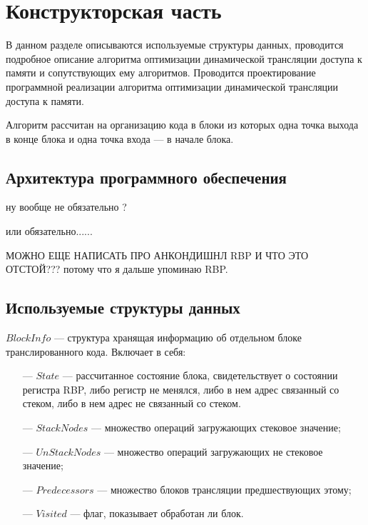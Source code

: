 \section{Конструкторская часть}

В данном разделе описываются используемые структуры данных, проводится
подробное описание алгоритма оптимизации динамической трансляции доступа к памяти и сопутствующих ему алгоритмов. Проводится проектирование программной реализации алгоритма оптимизации динамической трансляции доступа к памяти.

Алгоритм рассчитан на организацию кода в блоки из которых одна точка выхода в конце блока и одна точка входа --- в начале блока.

\subsection{Архитектура программного обеспечения}

ну вообще не обязательно ?

или обязательно...... 

МОЖНО ЕЩЕ НАПИСАТЬ ПРО АНКОНДИШНЛ RBP И ЧТО ЭТО ОТСТОЙ??? потому что я дальше упоминаю RBP.

\subsection{Используемые структуры данных}

$BlockInfo$ --- структура хранящая информацию об отдельном блоке транслированного кода. Включает в себя:

\begin{itemize}[leftmargin=1.6\parindent]
	\item[---] $State$ --- рассчитанное состояние блока, свидетельствует о состоянии регистра RBP, либо регистр не менялся, либо в нем адрес связанный со стеком, либо в нем адрес не связанный со стеком.
	\item[---] $StackNodes$ --- множество операций загружающих стековое значение;
	\item[---] $UnStackNodes$ --- множество операций загружающих не стековое значение;
	\item[---] $Predecessors$ --- множество блоков трансляции предшествующих этому;
	\item[---] $Visited$ --- флаг, показывает обработан ли блок.
\end{itemize}

\begin{comment}
{
	+  int State = NOT_CHANGED;
	+  std::set<OrderedNode*> StackNodes;
	+  std::set<OrderedNode*> UnStackNodes;
	+  std::vector<OrderedNode*> Predecessors;
	+  // std::vector<OrderedNode*> Successors;
	+  bool Visited = false;
	+};
+
\end{comment}

